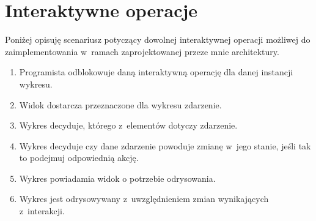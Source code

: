 \section{Interaktywne operacje}
Poniżej opisuję scenariusz potyczący dowolnej interaktywnej operacji możliwej do zaimplementowania w~ramach zaprojektowanej przeze mnie architektury.

\begin{enumerate}
\item{Programista odblokowuje daną interaktywną operację dla danej instancji wykresu.}
\item{Widok dostarcza przeznaczone dla wykresu zdarzenie.}
\item{Wykres decyduje, którego z~elementów dotyczy zdarzenie.}
\item{Wykres decyduje czy dane zdarzenie powoduje zmianę w~jego stanie, jeśli tak to podejmuj odpowiednią akcję.}
\item{Wykres powiadamia widok o potrzebie odrysowania.}
\item{Wykres jest odrysowywany z~uwzględnieniem zmian wynikających z~interakcji.}
\end{enumerate}








